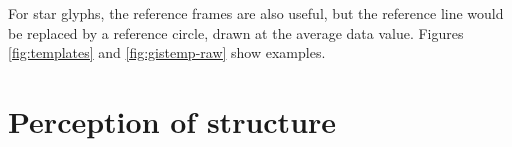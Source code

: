 \documentclass[oneside]{article}
\begin{document}
For star glyphs, the reference frames are also useful, but the reference line would be replaced by a reference circle, drawn at the average data value. Figures \ref{fig:templates} and \ref{fig:gistemp-raw} show examples.







\section{Perception of structure}~\label{sec:perception}

\end{document}
